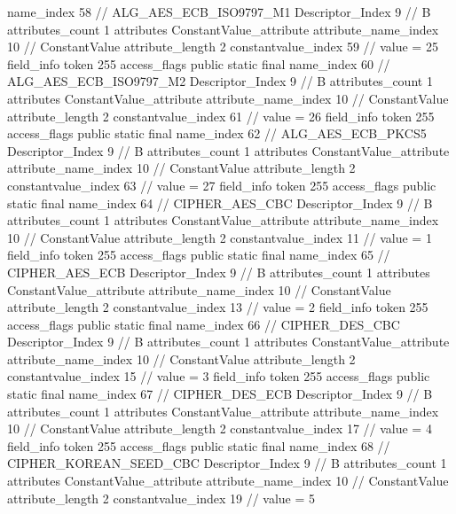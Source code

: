 {{{{{				name_index	58		// ALG_AES_ECB_ISO9797_M1
				Descriptor_Index	9		// B
				attributes_count	1
				attributes {
				ConstantValue_attribute {
					attribute_name_index	10		// ConstantValue
					attribute_length	2
					constantvalue_index	59		// value = 25
				}
				}
			}
			field_info {
				token	255
				access_flags	public static final
				name_index	60		// ALG_AES_ECB_ISO9797_M2
				Descriptor_Index	9		// B
				attributes_count	1
				attributes {
				ConstantValue_attribute {
					attribute_name_index	10		// ConstantValue
					attribute_length	2
					constantvalue_index	61		// value = 26
				}
				}
			}
			field_info {
				token	255
				access_flags	public static final
				name_index	62		// ALG_AES_ECB_PKCS5
				Descriptor_Index	9		// B
				attributes_count	1
				attributes {
				ConstantValue_attribute {
					attribute_name_index	10		// ConstantValue
					attribute_length	2
					constantvalue_index	63		// value = 27
				}
				}
			}
			field_info {
				token	255
				access_flags	public static final
				name_index	64		// CIPHER_AES_CBC
				Descriptor_Index	9		// B
				attributes_count	1
				attributes {
				ConstantValue_attribute {
					attribute_name_index	10		// ConstantValue
					attribute_length	2
					constantvalue_index	11		// value = 1
				}
				}
			}
			field_info {
				token	255
				access_flags	public static final
				name_index	65		// CIPHER_AES_ECB
				Descriptor_Index	9		// B
				attributes_count	1
				attributes {
				ConstantValue_attribute {
					attribute_name_index	10		// ConstantValue
					attribute_length	2
					constantvalue_index	13		// value = 2
				}
				}
			}
			field_info {
				token	255
				access_flags	public static final
				name_index	66		// CIPHER_DES_CBC
				Descriptor_Index	9		// B
				attributes_count	1
				attributes {
				ConstantValue_attribute {
					attribute_name_index	10		// ConstantValue
					attribute_length	2
					constantvalue_index	15		// value = 3
				}
				}
			}
			field_info {
				token	255
				access_flags	public static final
				name_index	67		// CIPHER_DES_ECB
				Descriptor_Index	9		// B
				attributes_count	1
				attributes {
				ConstantValue_attribute {
					attribute_name_index	10		// ConstantValue
					attribute_length	2
					constantvalue_index	17		// value = 4
				}
				}
			}
			field_info {
				token	255
				access_flags	public static final
				name_index	68		// CIPHER_KOREAN_SEED_CBC
				Descriptor_Index	9		// B
				attributes_count	1
				attributes {
				ConstantValue_attribute {
					attribute_name_index	10		// ConstantValue
					attribute_length	2
					constantvalue_index	19		// value = 5
}}}}}}}
